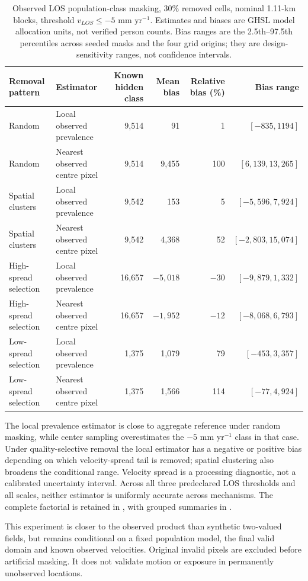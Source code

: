 \begin{table}[htbp]\centering\scriptsize
\caption{Observed LOS population-class masking, 30\% removed cells, nominal 1.11-km blocks, threshold $v_{LOS}\leq-5$ mm yr$^{-1}$. Estimates and biases are GHSL model allocation units, not verified person counts. Bias ranges are the 2.5th--97.5th percentiles across seeded masks and the four grid origins; they are design-sensitivity ranges, not confidence intervals.}
\begin{tabular}{llrrrr}\toprule
Removal pattern & Estimator & Known hidden class & Mean bias & Relative bias (\%) & Bias range\\\midrule
Random & Local observed prevalence & 9,514 & 91 & 1 & $[-835,1194]$\\
Random & Nearest observed centre pixel & 9,514 & 9,455 & 100 & $[6,139,13,265]$\\
Spatial clusters & Local observed prevalence & 9,542 & 153 & 5 & $[-5,596,7,924]$\\
Spatial clusters & Nearest observed centre pixel & 9,542 & 4,368 & 52 & $[-2,803,15,074]$\\
High-spread selection & Local observed prevalence & 16,657 & $-5,018$ & $-30$ & $[-9,879,1,332]$\\
High-spread selection & Nearest observed centre pixel & 16,657 & $-1,952$ & $-12$ & $[-8,068,6,793]$\\
Low-spread selection & Local observed prevalence & 1,375 & 1,079 & 79 & $[-453,3,357]$\\
Low-spread selection & Nearest observed centre pixel & 1,375 & 1,566 & 114 & $[-77,4,924]$\\\bottomrule
\end{tabular}
\end{table}

The local prevalence estimator is close to aggregate reference under random masking, while center sampling overestimates the $-5$ mm yr$^{-1}$ class in that case. Under quality-selective removal the local estimator has a negative or positive bias depending on which velocity-spread tail is removed; spatial clustering also broadens the conditional range. Velocity spread is a processing diagnostic, not a calibrated uncertainty interval. Across all three predeclared LOS thresholds and all scales, neither estimator is uniformly accurate across mechanisms. The complete factorial is retained in , with grouped summaries in .

This experiment is closer to the observed product than synthetic two-valued fields, but remains conditional on a fixed population model, the final valid domain and known observed velocities. Original invalid pixels are excluded before artificial masking. It does not validate motion or exposure in permanently unobserved locations.
